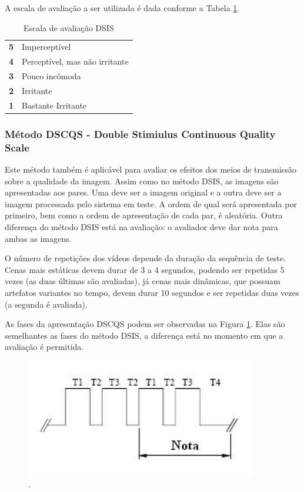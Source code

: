 A escala de avaliação a ser utilizada é dada conforme a Tabela \ref{tab:dsisescala}.

\begin{table}
	\centering
	\caption{Escala de avaliação DSIS}
	\label{tab:dsisescala}
	\begin{tabular}{c|l}
		\hline
		\textbf{5} & Imperceptível \\
		\textbf{4} & Perceptível, mas não irritante \\
		\textbf{3} & Pouco incômoda \\
		\textbf{2} & Irritante \\
		\textbf{1} & Bastante Irritante \\
		\hline
	\end{tabular}
\end{table}

\subsubsection[Método DSCQS]{Método DSCQS - Double Stimiulus Continuous Quality Scale}

Este método também é aplicável para avaliar os efeitos dos meios de transmissão sobre a qualidade da imagem. Assim como no método DSIS, as imagens são apresentadas aos pares. Uma deve ser a imagem original e a outra deve ser a imagem processada pelo sistema em teste. A ordem de qual será apresentada por primeiro, bem como a ordem de apresentação de cada par, é aleatória. Outra diferença do método DSIS está na avaliação: o avaliador deve dar nota para ambas as imagens.

O número de repetições dos vídeos depende da duração da sequência de teste. Cenas mais estáticas devem durar de 3 a 4 segundos, podendo ser repetidas 5 vezes (as duas últimas são avaliadas), já cenas mais dinâmicas, que possuam artefatos variantes no tempo, devem durar 10 segundos e ser repetidas duas vezes (a segunda é avaliada).

As fases da apresentação DSCQS podem ser observadas na Figura \ref{fig:dscqsfases}. Elas são semelhantes as fases do método DSIS, a diferença está no momento em que a avaliação é permitida. 

\begin{figure}[!htb]
	\centering
	\includegraphics[width=0.9\textwidth]{./imgs/dscqsfases.png}
	\caption{.}
	\label{fig:dscqsfases}
\end{figure}

